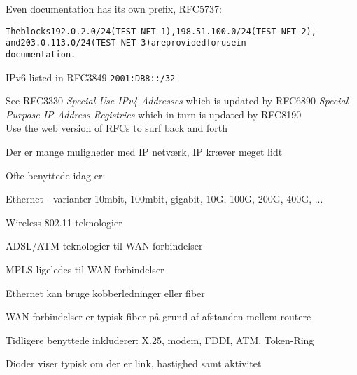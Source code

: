 \documentclass[Screen16to9,17pt]{foils}
\begin{document}

Even documentation has its own prefix, RFC5737:
\begin{alltt}
The blocks 192.0.2.0/24 (TEST-NET-1), 198.51.100.0/24 (TEST-NET-2),
and 203.0.113.0/24 (TEST-NET-3) are provided for use in
documentation.
\end{alltt}

IPv6 listed in RFC3849 \verb+2001:DB8::/32+

See RFC3330 \emph{Special-Use IPv4 Addresses} which is updated by
RFC6890 \emph{Special-Purpose IP Address Registries} which in turn is updated by RFC8190\\
Use the web version of RFCs to surf back and forth 






\begin{list1}
\item Der er mange muligheder med IP netværk, IP kræver meget lidt
\item Ofte benyttede idag er:
\begin{list2}
\item Ethernet - varianter 10mbit, 100mbit, gigabit, 10G, 100G, 200G, 400G, ...
\item Wireless 802.11 teknologier
\item ADSL/ATM teknologier til WAN forbindelser
\item MPLS ligeledes til WAN forbindelser
\end{list2}
\item Ethernet kan bruge kobberledninger eller fiber
\item WAN forbindelser er typisk fiber på grund af afstanden mellem routere
\item Tidligere benyttede inkluderer: X.25, modem, FDDI, ATM, Token-Ring
\end{list1}



\centerline{Dioder viser typisk om der er link, hastighed samt aktivitet}


\end{document}
